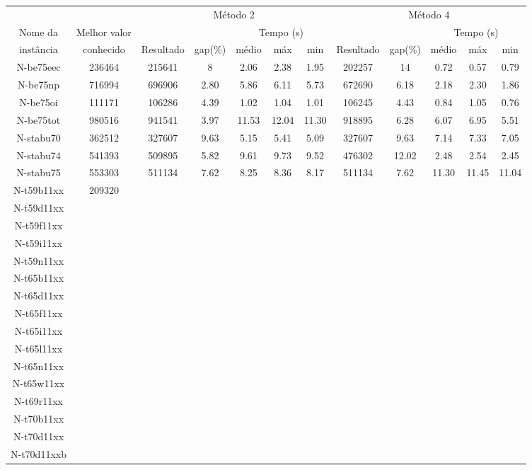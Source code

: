 \documentclass[a4paper,10pt,onecolumn]{article}
\begin{document}
\begin{table}[htbp]
  \noindent
  \footnotesize
  \centering
  \begin{tabular*}{\linewidth}{|c|c|ccccc|ccccc|}
    \hline 
    & & 
    \multicolumn{5}{c|}{Método 2} &
    \multicolumn{5}{c|}{Método 4} \\
    Nome da & Melhor valor & 
    && \multicolumn{3}{c|}{Tempo (s)} &
    && \multicolumn{3}{c|}{Tempo (s)} \\
    instância &  conhecido & 
    Resultado & gap(\%) & médio & máx & min &
    Resultado & gap(\%)  & médio & máx & min 
\\
    \hline
    N-be75eec & 236464 & 
    215641 & 8 & 2.06 & 2.38 & 1.95 &
    202257 & 14 & 0.72 & 0.57 & 0.79 
\\
    N-be75np & 716994 & 
696906 & 2.80 & 5.86   & 6.11  & 5.73 &
672690 & 6.18 & 2.18   & 2.30  & 1.86 
\\
    N-be75oi & 111171 & 
106286 & 4.39 & 1.02   & 1.04  & 1.01 &
106245 & 4.43 & 0.84   & 1.05  & 0.76 
\\
    N-be75tot & 980516 &
 941541 & 3.97 & 11.53   & 12.04  & 11.30  &
918895 & 6.28 & 6.07   & 6.95  & 5.51 
\\
    N-stabu70 & 362512 & 
327607 & 9.63 & 5.15   & 5.41  & 5.09 &
327607 & 9.63 & 7.14   & 7.33  & 7.05 
\\
    N-stabu74 & 541393 &
509895 & 5.82 & 9.61   & 9.73  & 9.52 &
476302 & 12.02 & 2.48   & 2.54  & 2.45 
\\
    N-stabu75 & 553303 &
511134 & 7.62 & 8.25   & 8.36  & 8.17 &
511134 & 7.62 & 11.30   & 11.45  & 11.04 
\\
    N-t59b11xx & 209320 &
\\
    N-t59d11xx & 
\\
    N-t59f11xx
\\
    N-t59i11xx
\\
    N-t59n11xx
\\
    N-t65b11xx
\\
    N-t65d11xx
\\
    N-t65f11xx
\\
    N-t65i11xx
\\
    N-t65l11xx
\\
    N-t65n11xx
\\
    N-t65w11xx
\\
    N-t69r11xx
\\
    N-t70b11xx
\\
    N-t70d11xx
\\
    N-t70d11xxb
\\

\end{tabular*}
\end{table}
\end{document}
